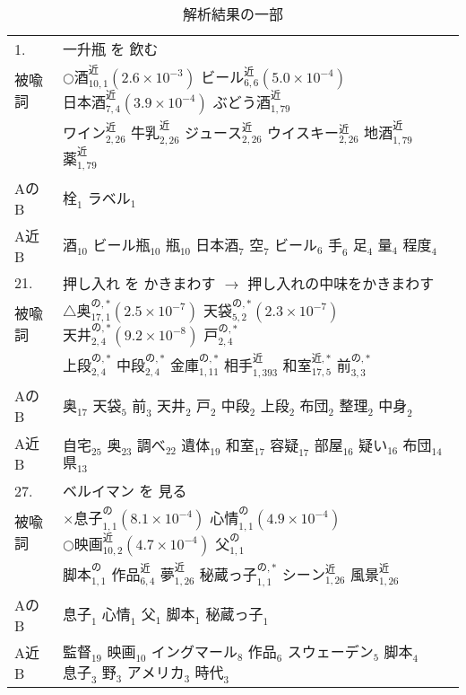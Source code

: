 \begin{table}[htbp]
  \footnotesize
  \begin{center}
    
    \caption{解析結果の一部}
    
    \begin{tabular}{|l|l|}
            \hline
1.& 一升瓶 を 飲む\\
被喩詞 & $○酒^{近}_{10,1}(2.6\times{}10^{-3})$ $ビール^{近}_{6,6}(5.0\times{}10^{-4})$ $日本酒^{近}_{7,4}(3.9\times{}10^{-4})$ $ぶどう酒^{近}_{1,79}$\\
 & $ワイン^{近}_{2,26}$ $牛乳^{近}_{2,26}$ $ジュース^{近}_{2,26}$ $ウイスキー^{近}_{2,26}$ $地酒^{近}_{1,79}$ $薬^{近}_{1,79}$\\
AのB & $栓_{1}$ $ラベル_{1}$\\
A近B & $酒_{10}$ $ビール瓶_{10}$ $瓶_{10}$ $日本酒_{7}$ $空_{7}$ $ビール_{6}$ $手_{6}$ $足_{4}$ $量_{4}$ $程度_{4}$\\
\hline
21.& 押し入れ を かきまわす $\rightarrow$ 押し入れの中味をかきまわす\\
被喩詞 & $△奥^{の,*}_{17,1}(2.5\times{}10^{-7})$ $天袋^{の,*}_{5,2}(2.3\times{}10^{-7})$ $天井^{の,*}_{2,4}(9.2\times{}10^{-8})$ $戸^{の,*}_{2,4}$\\
 & $上段^{の,*}_{2,4}$ $中段^{の,*}_{2,4}$ $金庫^{の,*}_{1,11}$ $相手^{近}_{1,393}$ $和室^{近,*}_{17,5}$ $前^{の,*}_{3,3}$\\
AのB & $奥_{17}$ $天袋_{5}$ $前_{3}$ $天井_{2}$ $戸_{2}$ $中段_{2}$ $上段_{2}$ $布団_{2}$ $整理_{2}$ $中身_{2}$\\
A近B & $自宅_{25}$ $奥_{23}$ $調べ_{22}$ $遺体_{19}$ $和室_{17}$ $容疑_{17}$ $部屋_{16}$ $疑い_{16}$ $布団_{14}$ $県_{13}$\\
\hline
27.& ベルイマン を 見る\\
被喩詞 & $×息子^{の}_{1,1}(8.1\times{}10^{-4})$ $心情^{の}_{1,1}(4.9\times{}10^{-4})$ $○映画^{近}_{10,2}(4.7\times{}10^{-4})$ $父^{の}_{1,1}$\\
 & $脚本^{の}_{1,1}$ $作品^{近}_{6,4}$ $夢^{近}_{1,26}$ $秘蔵っ子^{の,*}_{1,1}$ $シーン^{近}_{1,26}$ $風景^{近}_{1,26}$\\
AのB & $息子_{1}$ $心情_{1}$ $父_{1}$ $脚本_{1}$ $秘蔵っ子_{1}$\\
A近B & $監督_{19}$ $映画_{10}$ $イングマール_{8}$ $作品_{6}$ $スウェーデン_{5}$ $脚本_{4}$ $息子_{3}$ $野_{3}$ $アメリカ_{3}$ $時代_{3}$\\
\hline
    \end{tabular}
    \label{tab:ex}
  \end{center}
\end{table}

